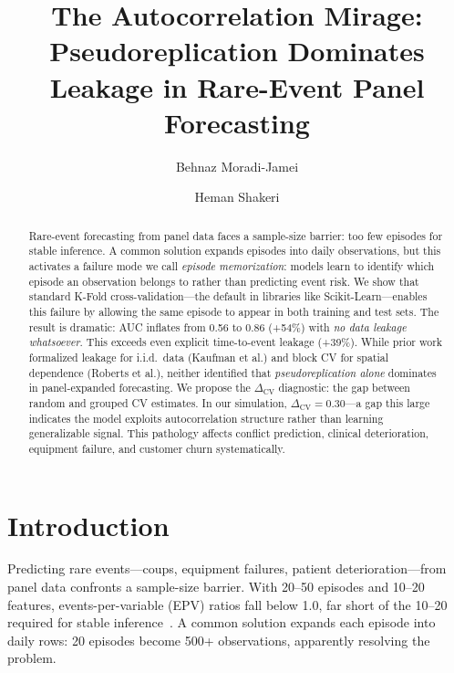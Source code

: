 \documentclass[acmsmall,nonacm]{acmart}
\newcommand{\1}{\mathbbm{1}}
\newcommand{\DeltaCV}{\Delta_{\text{CV}}}
\begin{document}
\title{The Autocorrelation Mirage: Pseudoreplication Dominates Leakage in Rare-Event Panel Forecasting}

\author{Behnaz Moradi-Jamei}
\author{Heman Shakeri}


\begin{abstract}
Rare-event forecasting from panel data faces a sample-size barrier: too few episodes for stable inference. A common solution expands episodes into daily observations, but this activates a failure mode we call \emph{episode memorization}: models learn to identify which episode an observation belongs to rather than predicting event risk. We show that standard K-Fold cross-validation---the default in libraries like Scikit-Learn---enables this failure by allowing the same episode to appear in both training and test sets. The result is dramatic: AUC inflates from 0.56 to 0.86 (+54\%) with \textit{no data leakage whatsoever}. This exceeds even explicit time-to-event leakage (+39\%). While prior work formalized leakage for i.i.d.\ data (Kaufman et al.) and block CV for spatial dependence (Roberts et al.), neither identified that \textit{pseudoreplication alone} dominates in panel-expanded forecasting. We propose the $\DeltaCV$ diagnostic: the gap between random and grouped CV estimates. In our simulation, $\DeltaCV = 0.30$---a gap this large indicates the model exploits autocorrelation structure rather than learning generalizable signal. This pathology affects conflict prediction, clinical deterioration, equipment failure, and customer churn systematically.
\end{abstract}

\maketitle

\section{Introduction}

Predicting rare events---coups, equipment failures, patient deterioration---from panel data confronts a sample-size barrier. With 20--50 episodes and 10--20 features, events-per-variable (EPV) ratios fall below 1.0, far short of the 10--20 required for stable inference~\cite{peduzzi1996,vansmeden2016}. A common solution expands each episode into daily rows: 20 episodes become 500+ observations, apparently resolving the problem.
\end{document}
